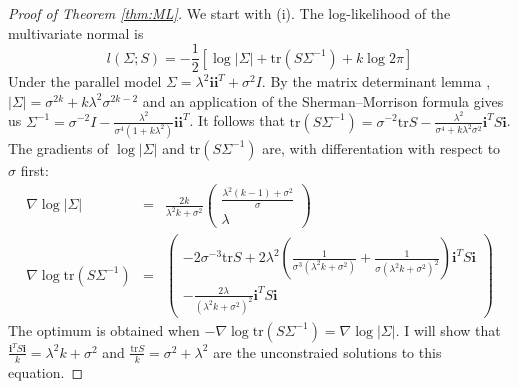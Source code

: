 \documentclass[twoside]{article}
\begin{document}
\begin{proof}[Proof of Theorem \ref{thm:ML}]\label{proof:ML}
We start with (i). The log-likelihood of the multivariate normal is
\begin{equation}
l\left(\Sigma;S\right)=-\frac{1}{2}\left[\log\left|\Sigma\right|+\textrm{tr}\left(S\Sigma^{-1}\right)+k\log2\pi\right]
\end{equation}
Under the parallel model $\Sigma=\lambda^{2}\mathbf{i}\mathbf{i}^{T}+\sigma^{2}I$.
By the matrix determinant lemma \citep[][Theorem 18.1.1 (p. 416)]{Harville2008-el}, $\left|\Sigma\right|=\sigma^{2k}+k\lambda^{2}\sigma^{2k-2}$
and an application of the Sherman--Morrison formula \citep{shermanmorrison}
gives us $\Sigma^{-1}=\sigma^{-2}I-\frac{\lambda^{2}}{\sigma^{4}\left(1+k\lambda^{2}\right)}\mathbf{i}\mathbf{i}^{T}$.
It follows that $\textrm{tr}\left(S\Sigma^{-1}\right)=\sigma^{-2}\textrm{tr}S-\frac{\lambda^{2}}{\sigma^{4}+k\lambda^{2}\sigma^{2}}\mathbf{i}^{T}S\mathbf{i}$.
The gradients of $\log\left|\Sigma\right|$ and $\textrm{tr}\left(S\Sigma^{-1}\right)$
are, with differentation with respect to $\sigma$ first:
\begin{eqnarray}
\nabla\log\left|\Sigma\right| & = & \frac{2k}{\lambda^{2}k+\sigma^{2}}\left(\begin{array}{c}
\frac{\lambda^{2}\left(k-1\right)+\sigma^{2}}{\sigma}\\
\lambda
\end{array}\right)\\
\nabla\log\textrm{tr}\left(S\Sigma^{-1}\right) & = & \left(\begin{array}{c}
-2\sigma^{-3}\textrm{tr}S+2\lambda^{2}\left(\frac{1}{\sigma^{3}\left(\lambda^{2}k+\sigma^{2}\right)}+\frac{1}{\sigma\left(\lambda^{2}k+\sigma^{2}\right)^{2}}\right)\mathbf{i}^{T}S\mathbf{i}\\
-\frac{2\lambda}{\left(\lambda^{2}k+\sigma^{2}\right)^{2}}\mathbf{i}^{T}S\mathbf{i}
\end{array}\right)\nonumber 
\end{eqnarray}
The optimum is obtained when $-\nabla\log\textrm{tr}\left(S\Sigma^{-1}\right)=\nabla\log\left|\Sigma\right|$.
I will show that $\frac{\mathbf{i}^{T}S\mathbf{i}}{k}=\lambda^{2}k+\sigma^{2}$
and $\frac{\textrm{tr}S}{k}=\sigma^{2}+\lambda^{2}$ are the unconstraied
solutions to this equation.


\end{proof}
\end{document}
